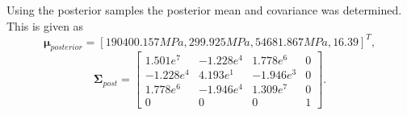 \documentclass{article}
\begin{document}
	Using the posterior samples the posterior mean and covariance was determined. This is given as
	\begin{equation}
	\boldsymbol\mu_{posterior} = \left[ 190400.157 MPa, 299.925MPa, 54681.867MPa, 16.39 \right]^T,
	\end{equation}
	\begin{equation}
		\boldsymbol\Sigma_{post} = \begin{bmatrix}
			1.501e^{7} & -1.228e^{4} & 1.778e^{6} & 0 \\
			-1.228e^{4} & 4.193e^{1} & -1.946e^{3} & 0 \\
			1.778e^{6} & -1.946e^{4} & 1.309e^{7} & 0 \\
			0 & 0 & 0 & 1 
		\end{bmatrix}.
	\end{equation}
\end{document}
